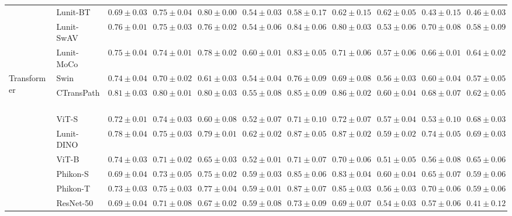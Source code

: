 \begin{tabular}{ll|cccc|c|cccc}
 & Lunit-BT~\cite{kang2023benchmarking} & $0.69 \pm 0.03$ & $0.75 \pm 0.04$ & $0.80 \pm 0.00$ & $0.54 \pm 0.03$ & $0.58 \pm 0.17$ & $0.62 \pm 0.15$ & $0.62 \pm 0.05$ & $0.43 \pm 0.15$ & $0.46 \pm 0.03$ \\
 & Lunit-SwAV~\cite{kang2023benchmarking} & $0.76 \pm 0.01$ & $0.75 \pm 0.03$ & $0.76 \pm 0.02$ & $0.54 \pm 0.06$ & $0.84 \pm 0.06$ & $0.80 \pm 0.03$ & $0.53 \pm 0.06$ & $0.70 \pm 0.08$ & $0.58 \pm 0.09$ \\
 & Lunit-MoCo~\cite{kang2023benchmarking} & $0.75 \pm 0.04$ & $0.74 \pm 0.01$ & $0.78 \pm 0.02$ & $0.60 \pm 0.01$ & $0.83 \pm 0.05$ & $0.71 \pm 0.06$ & $0.57 \pm 0.06$ & $0.66 \pm 0.01$ & $0.64 \pm 0.02$ \\
\cline{1-11}
\multirow[t]{12}{*}{Transformer} & Swin~\cite{liu2021swin} & $0.74 \pm 0.04$ & $0.70 \pm 0.02$ & $0.61 \pm 0.03$ & $0.54 \pm 0.04$ & $0.76 \pm 0.09$ & $0.69 \pm 0.08$ & $0.56 \pm 0.03$ & $0.60 \pm 0.04$ & $0.57 \pm 0.05$ \\
 & CTransPath~\cite{wang2022transformer} & $\mathbf{0.81 \pm 0.03}$ & $\mathbf{0.80 \pm 0.01}$ & $0.80 \pm 0.03$ & $0.55 \pm 0.08$ & $0.85 \pm 0.09$ & $0.86 \pm 0.02$ & $0.60 \pm 0.04$ & $0.68 \pm 0.07$ & $0.62 \pm 0.05$ \\
 & ViT-S~\cite{kolesnikov2021image} & $0.72 \pm 0.01$ & $0.74 \pm 0.03$ & $0.60 \pm 0.08$ & $0.52 \pm 0.07$ & $0.71 \pm 0.10$ & $0.72 \pm 0.07$ & $0.57 \pm 0.04$ & $0.53 \pm 0.10$ & $0.68 \pm 0.03$ \\
 & Lunit-DINO~\cite{kang2023benchmarking} & $0.78 \pm 0.04$ & $0.75 \pm 0.03$ & $0.79 \pm 0.01$ & $\mathbf{0.62 \pm 0.02}$ & $\mathbf{0.87 \pm 0.05}$ & $\mathbf{0.87 \pm 0.02}$ & $0.59 \pm 0.02$ & $\mathbf{0.74 \pm 0.05}$ & $\mathbf{0.69 \pm 0.03}$ \\
 & ViT-B~\cite{kolesnikov2021image} & $0.74 \pm 0.03$ & $0.71 \pm 0.02$ & $0.65 \pm 0.03$ & $0.52 \pm 0.01$ & $0.71 \pm 0.07$ & $0.70 \pm 0.06$ & $0.51 \pm 0.05$ & $0.56 \pm 0.08$ & $0.65 \pm 0.06$ \\
 & Phikon-S~\cite{filiot2023scaling} & $0.69 \pm 0.04$ & $0.73 \pm 0.05$ & $0.75 \pm 0.02$ & $0.59 \pm 0.03$ & $0.85 \pm 0.06$ & $0.83 \pm 0.04$ & $0.60 \pm 0.04$ & $0.65 \pm 0.07$ & $0.59 \pm 0.06$ \\
 & Phikon-T~\cite{filiot2023scaling} & $0.73 \pm 0.03$ & $0.75 \pm 0.03$ & $0.77 \pm 0.04$ & $0.59 \pm 0.01$ & $0.87 \pm 0.07$ & $0.85 \pm 0.03$ & $0.56 \pm 0.03$ & $0.70 \pm 0.06$ & $0.59 \pm 0.06$ \\
 & ResNet-50~\cite{he2015deep} & $0.69 \pm 0.04$ & $0.71 \pm 0.08$ & $0.67 \pm 0.02$ & $0.59 \pm 0.08$ & $0.73 \pm 0.09$ & $0.69 \pm 0.07$ & $0.54 \pm 0.03$ & $0.57 \pm 0.06$ & $0.41 \pm 0.12$ \\

\end{tabular}
